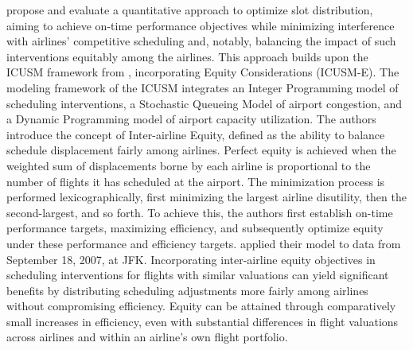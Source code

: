  propose and evaluate a quantitative
approach to optimize slot distribution, aiming to achieve on-time performance
objectives while minimizing interference with airlines’ competitive scheduling
and, notably, balancing the impact of such interventions equitably among the
airlines.
%
This approach builds upon the \acrfull{ICUSM} framework from
, incorporating Equity Considerations
(\acrshort{ICUSM-E}).
%
The modeling framework of the \acrshort{ICUSM} integrates an Integer Programming
model of scheduling interventions, a Stochastic Queueing Model of airport
congestion, and a Dynamic Programming model of airport capacity utilization.
%
The authors introduce the concept of Inter-airline Equity, defined as the
ability to balance schedule displacement fairly among airlines.
%
Perfect equity is achieved when the weighted sum of displacements borne by each
airline is proportional to the number of flights it has scheduled at the
airport.
%
The minimization process is performed lexicographically, first minimizing the
largest airline disutility, then the second-largest, and so forth.
%
To achieve this, the authors first establish on-time performance targets,
maximizing efficiency, and subsequently optimize equity under these performance
and efficiency targets.
%
 applied their model to data from
September 18, 2007, at \acrfull{JFK}.
%
Incorporating inter-airline equity objectives in scheduling interventions for
flights with similar valuations can yield significant benefits by distributing
scheduling adjustments more fairly among airlines without compromising
efficiency.
%
Equity can be attained through comparatively small increases in efficiency, even
with substantial differences in flight valuations across airlines and within an
airline's own flight portfolio.



